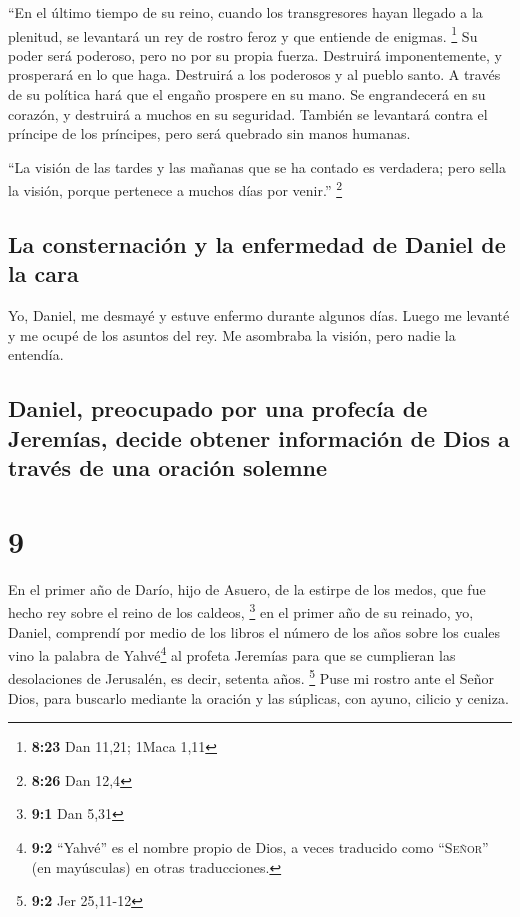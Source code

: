  ``En el último tiempo de su reino, cuando los
transgresores hayan llegado a la plenitud, se levantará un rey de rostro
feroz y que entiende de enigmas. \footnote{\textbf{8:23} Dan 11,21;
  1Maca 1,11}  Su poder será poderoso, pero no por su
propia fuerza. Destruirá imponentemente, y prosperará en lo que haga.
Destruirá a los poderosos y al pueblo santo.  A través de
su política hará que el engaño prospere en su mano. Se engrandecerá en
su corazón, y destruirá a muchos en su seguridad. También se levantará
contra el príncipe de los príncipes, pero será quebrado sin manos
humanas.

 ``La visión de las tardes y las mañanas que se ha
contado es verdadera; pero sella la visión, porque pertenece a muchos
días por venir.'' \footnote{\textbf{8:26} Dan 12,4}

\hypertarget{la-consternaciuxf3n-y-la-enfermedad-de-daniel-de-la-cara}{%
\subsection{La consternación y la enfermedad de Daniel de la
cara}\label{la-consternaciuxf3n-y-la-enfermedad-de-daniel-de-la-cara}}

 Yo, Daniel, me desmayé y estuve enfermo durante algunos
días. Luego me levanté y me ocupé de los asuntos del rey. Me asombraba
la visión, pero nadie la entendía.

\hypertarget{daniel-preocupado-por-una-profecuxeda-de-jeremuxedas-decide-obtener-informaciuxf3n-de-dios-a-travuxe9s-de-una-oraciuxf3n-solemne}{%
\subsection{Daniel, preocupado por una profecía de Jeremías, decide
obtener información de Dios a través de una oración
solemne}\label{daniel-preocupado-por-una-profecuxeda-de-jeremuxedas-decide-obtener-informaciuxf3n-de-dios-a-travuxe9s-de-una-oraciuxf3n-solemne}}

\hypertarget{section-8}{%
\section{9}\label{section-8}}

 En el primer año de Darío, hijo de Asuero, de la estirpe
de los medos, que fue hecho rey sobre el reino de los caldeos,
\footnote{\textbf{9:1} Dan 5,31}  en el primer año de su
reinado, yo, Daniel, comprendí por medio de los libros el número de los
años sobre los cuales vino la palabra de Yahvé\footnote{\textbf{9:2}
  ``Yahvé'' es el nombre propio de Dios, a veces traducido como
  ``\textsc{Señor}'' (en mayúsculas) en otras traducciones.} al profeta
Jeremías para que se cumplieran las desolaciones de Jerusalén, es decir,
setenta años. \footnote{\textbf{9:2} Jer 25,11-12}  Puse
mi rostro ante el Señor Dios, para buscarlo mediante la oración y las
súplicas, con ayuno, cilicio y ceniza.

